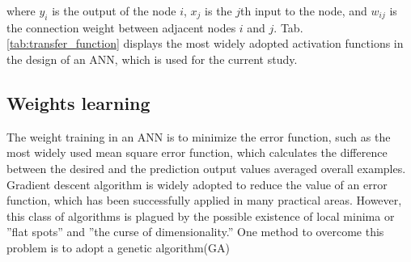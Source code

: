 where $y_i$ is the output of the node $i$, $x_j$ is the $j$th input to the
node, and $w_{ij}$ is the connection weight between adjacent nodes $i$ and $j$.
Tab. \ref{tab:transfer_function} displays the most widely adopted activation
functions in the design of an ANN, which is used for the current study.



\subsection{Weights learning}
The weight training in an ANN is to minimize the error function, such as the
most widely used mean square error function, which calculates the difference
between the desired and the prediction output values averaged overall examples.
Gradient descent algorithm is widely adopted to reduce the value of an error
function, which has been successfully applied in many practical areas. However,
this class of algorithms is plagued by the possible existence of local minima
or ”flat spots” and ”the curse of dimensionality.” One method to overcome this
problem is to adopt a genetic algorithm(GA)

